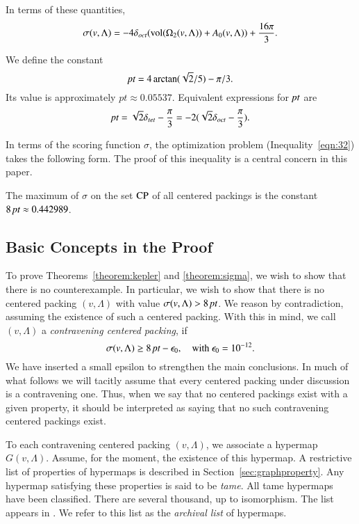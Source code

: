 In terms of these quantities,
\begin{equation}
    \sigma(v,\Lambda) = -4 \delta_{oct} ({\operatorname{vol}}(\Omega_2(v,\Lambda)) + A_0(v,\Lambda)) +
    \frac{16\pi}{3}.
\end{equation}

\begin{definition}\label{def:pt}
We define the constant
   $$\hbox{\it pt} = 4\arctan(\sqrt2/5) - \pi/3.$$
Its value is approximately $pt \approx 0.05537.$  Equivalent
expressions for $\hbox{\it pt}$ are
    $$
    \hbox{\it pt} = \sqrt2 \delta_{tet} - \frac{\pi}{3} = -2 (\sqrt2 \delta_{oct} -
    \frac{\pi}{3}).
    $$
\end{definition}

In terms of the scoring function $\sigma$, the optimization
problem (Inequality~\ref{eqn:32}) takes the following form. The
proof of this inequality is a central concern in this paper.

\begin{theorem}\label{theorem:sigma}
The maximum of $\sigma$ on the set ${\operatorname{CP}}$ of all centered
packings is the constant $8\,\hbox{\it pt}\approx 0.442989$.
\end{theorem}



\subsection{Basic Concepts in the Proof}
\label{sec:outline}

To prove Theorems~\ref{theorem:kepler} and \ref{theorem:sigma}, we
wish to show that there is no counterexample.  In particular, we
wish to show that there is no centered packing $(v,\Lambda)$ with value
$\sigma(v,\Lambda)
> 8\,\hbox{\it pt}$.  We reason by contradiction, assuming the existence of
such a centered packing.  With this in mind, we call $(v,\Lambda)$ a {\it
contravening centered packing}, if
    $$\sigma(v,\Lambda)\ge 8\,\hbox{\it pt} - \epsilon_0, \quad \text{with }\epsilon_0 = 10^{-12}.$$
We have inserted a small epsilon to strengthen the main
conclusions.  In much of what follows we will tacitly assume that
every centered packing under discussion is a contravening one.
Thus, when we say that no centered packings exist with a given
property, it should be interpreted as saying that no such
contravening centered packings exist.

To each contravening centered packing $(v,\Lambda)$, we associate a hypermap
$G(v,\Lambda)$.   Assume, for the moment, the existence of this hypermap.
A restrictive list of properties of hypermaps is described in
Section~\ref{sec:graphproperty}. Any hypermap satisfying these
properties is said to be {\it tame}. All  tame
hypermaps have been classified. There are several thousand, up to
isomorphism.  The list appears in \cite{web}.  We refer to this
list as the {\it archival list}
of hypermaps.

